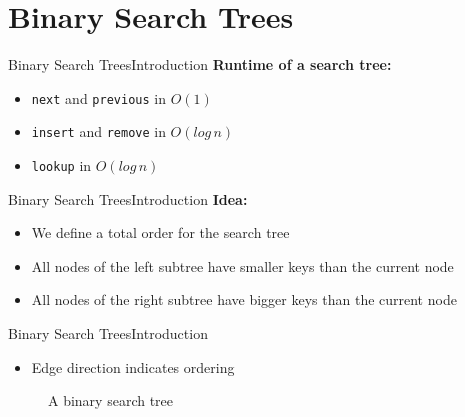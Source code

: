 \section{Binary Search Trees}

\begin{frame}{Binary Search Trees}{Introduction}
  \textbf{Runtime of a search tree:}
  \begin{itemize}
    \item<2->
      {\color{Mittel-Blau}\texttt{next}} and
      {\color{Mittel-Blau}\texttt{previous}} in $O(1)$\\[0.5em]
      \vspace{1em}
  \item<4->
    {\color{Mittel-Blau}\texttt{insert}} and
    {\color{Mittel-Blau}\texttt{remove}} in $O(log\,n)$
    \vspace{1em}
  \item<5->
    {\color{Mittel-Blau}\texttt{lookup}} in $O(log\,n)$\\[0.5em]
  \end{itemize}
\end{frame}


\begin{frame}{Binary Search Trees}{Introduction}
  \textbf{Idea:}
  \begin{itemize}
    \item<2->
      We define a total order for the search tree
    \item<3->
      All nodes of the left subtree have {\color{Mittel-Blau}smaller keys}
      than the current node
    \item<4->
      All nodes of the right subtree have {\color{Mittel-Blau}bigger keys}
      than the current node
  \end{itemize}
\end{frame}


\begin{frame}{Binary Search Trees}{Introduction}
  \begin{itemize}
    \item
      Edge direction indicates ordering
  \end{itemize}
  \begin{figure}
    
    \caption{A binary search tree}
    \label{fig:binary_search_trees:binary_tree_example1}
  \end{figure}
\end{frame}

